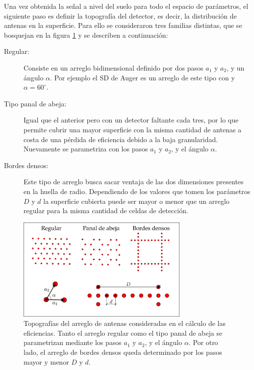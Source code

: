 	Una vez obtenida la se\~nal a nivel del suelo para todo el espacio de par\'ametros, el siguiente paso es definir la topograf\'ia del detector, es decir, la distribuci\'on de antenas en la superficie.
	Para ello se consideraron tres familias distintas, que se bosquejan en la figura \ref{fig:topoRadio} y se describen a continuaci\'on:
	\begin{description}
	 \item[Regular:] Consiste en un arreglo bidimensional definido por dos pasos $a_1$ y $a_2$, y un \'angulo $\alpha$. Por ejemplo el SD de Auger es un arreglo de este tipo con  y $\alpha=60^\circ$.
	 \item[Tipo panal de abeja:] Igual que el anterior pero con un detector faltante cada tres, por lo que permite cubrir una mayor superficie con la misma cantidad de antenas a costa de una p\'erdida de eficiencia debido a la baja granularidad. Nuevamente se parametriza con los pasos $a_1$ y $a_2$, y el \'angulo $\alpha$. 
	 \item[Bordes densos:] Este tipo de arreglo busca sacar ventaja de las dos dimensiones presentes en la huella de radio. Dependiendo de los valores que tomen los par\'ametros $D$ y $d$ la superficie cubierta puede ser mayor o menor que un arreglo regular para la misma cantidad de celdas de detecci\'on.  
	\end{description}
	\begin{figure}[h!]
		\begin{center}
			\includegraphics[width=0.75\textwidth]{fig/resultadosRadio/topografia}
			\caption{\label{fig:topoRadio} Topograf\'ias del arreglo de antenas consideradas en el c\'alculo de las eficiencias. Tanto el arreglo regular como el tipo panal de abeja se parametrizan mediante los pasos $a_1$ y $a_2$, y el \'angulo $\alpha$. Por otro lado, el arreglo de bordes densos queda determinado por los pasos mayor y menor $D$ y $d$.
			}
		\end{center}
	\end{figure}
	
